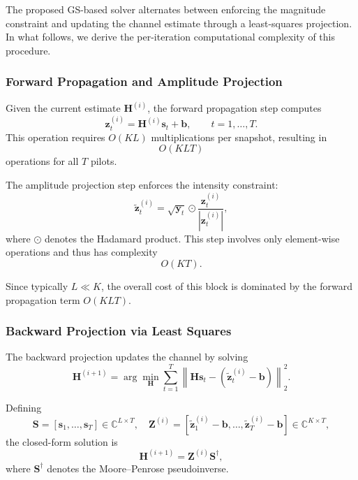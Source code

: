 \documentclass[journal]{IEEEtran}
\begin{document}
The proposed GS-based solver alternates between enforcing the magnitude
constraint and updating the channel estimate through a least-squares
projection. In what follows, we derive the per-iteration computational
complexity of this procedure.

\subsubsection{Forward Propagation and Amplitude Projection}

Given the current estimate $\mathbf H^{(i)}$, the forward propagation step
computes
\begin{equation}
\mathbf z_t^{(i)} = \mathbf H^{(i)}\mathbf s_t + \mathbf b,
\qquad t=1,\ldots,T.
\end{equation}
This operation requires $O(KL)$ multiplications per snapshot, resulting in
\begin{equation}
O(KLT)
\end{equation}
operations for all $T$ pilots.

The amplitude projection step enforces the intensity constraint:
\begin{equation}
\tilde{\mathbf z}_t^{(i)}
= \sqrt{\mathbf y_t}\odot
\frac{\mathbf z_t^{(i)}}{|\mathbf z_t^{(i)}|},
\end{equation}
where $\odot$ denotes the Hadamard product.
This step involves only element-wise operations and thus has complexity
\begin{equation}
O(KT).
\end{equation}

Since typically $L\ll K$, the overall cost of this block is dominated by
the forward propagation term $O(KLT)$.

\subsubsection{Backward Projection via Least Squares}

The backward projection updates the channel by solving
\begin{equation}
\mathbf H^{(i+1)}
=
\arg\min_{\mathbf H}
\sum_{t=1}^{T}
\left\|
\mathbf H\mathbf s_t
-
\left(\tilde{\mathbf z}_t^{(i)}-\mathbf b\right)
\right\|_2^2 .
\end{equation}

Defining
\begin{equation}
\mathbf S = [\mathbf s_1,\ldots,\mathbf s_T]\in\mathbb C^{L\times T},
\quad
\mathbf Z^{(i)} = [\tilde{\mathbf z}_1^{(i)}-\mathbf b,\ldots,
\tilde{\mathbf z}_T^{(i)}-\mathbf b]\in\mathbb C^{K\times T},
\end{equation}
the closed-form solution is
\begin{equation}
\mathbf H^{(i+1)} = \mathbf Z^{(i)} \mathbf S^\dagger,
\end{equation}
where $\mathbf S^\dagger$ denotes the Moore--Penrose pseudoinverse.
\end{document}
